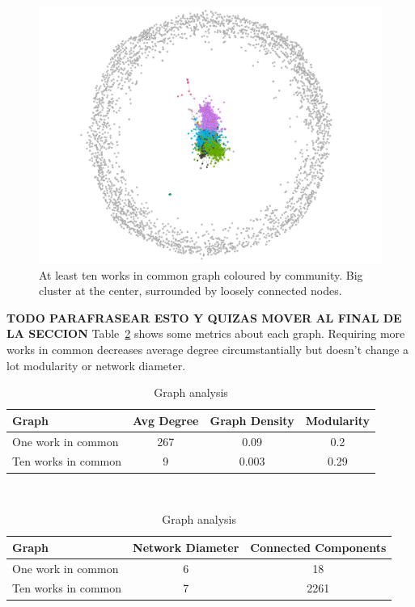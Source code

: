 \begin{figure}[!hbt]
	\begin{center}
	\includegraphics[width=\columnwidth]{graphics/atLeast10WorksCommunity.png}
	\caption{At least ten works in common graph coloured by community. Big cluster at the center, surrounded by loosely connected nodes.}
	\label{fig:graph10CommunityColoured}
	\end{center}
\end{figure}

\textbf{TODO PARAFRASEAR ESTO Y QUIZAS MOVER AL FINAL DE LA SECCION}
Table~\ref{tab:graphComparision} shows some metrics about each graph. Requiring more works in common decreases average degree circumstantially but doesn't change a lot modularity or network diameter.

\begin{table}[!hbt]
	\begin{center}
	\caption{Graph analysis}
	\label{tab:graphComparision}
	\begin{tabular}{|l|c|c|c|}
		\hline
		Graph & Avg Degree & Graph Density & Modularity \\
		\hline
		One work in common & 267 & 0.09 & 0.2 \\
		\hline
		Ten works in common & 9 & 0.003 & 0.29 \\
		\hline
	\end{tabular}\\
	\smallskip
	\begin{tabular}{|l|c|c|}
		\hline
		Graph & Network Diameter & Connected Components \\
		\hline
		One work in common & 6 & 18 \\
		\hline
		Ten works in common & 7 & 2261 \\
		\hline
	\end{tabular}
	\end{center}
\end{table}

